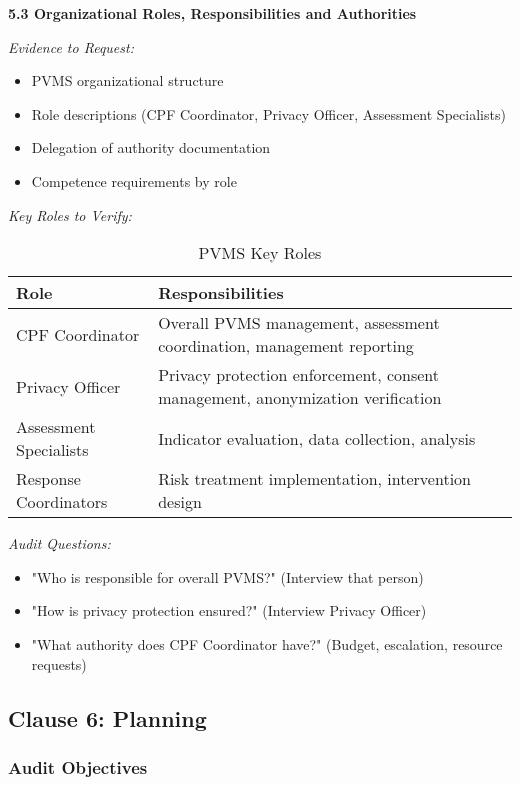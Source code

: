 \documentclass[11pt,a4paper]{article}
\begin{document}
\textbf{5.3 Organizational Roles, Responsibilities and Authorities}

\textit{Evidence to Request:}
\begin{itemize}
\item PVMS organizational structure
\item Role descriptions (CPF Coordinator, Privacy Officer, Assessment Specialists)
\item Delegation of authority documentation
\item Competence requirements by role
\end{itemize}

\textit{Key Roles to Verify:}

\begin{table}[h]
\centering
\caption{PVMS Key Roles}
\small
\begin{tabular}{lp{8cm}}
\toprule
\textbf{Role} & \textbf{Responsibilities} \\
\midrule
CPF Coordinator & Overall PVMS management, assessment coordination, management reporting \\
Privacy Officer & Privacy protection enforcement, consent management, anonymization verification \\
Assessment Specialists & Indicator evaluation, data collection, analysis \\
Response Coordinators & Risk treatment implementation, intervention design \\
\bottomrule
\end{tabular}
\end{table}

\textit{Audit Questions:}
\begin{itemize}
\item "Who is responsible for overall PVMS?" (Interview that person)
\item "How is privacy protection ensured?" (Interview Privacy Officer)
\item "What authority does CPF Coordinator have?" (Budget, escalation, resource requests)
\end{itemize}

\subsection{Clause 6: Planning}

\subsubsection{Audit Objectives}
\end{document}
